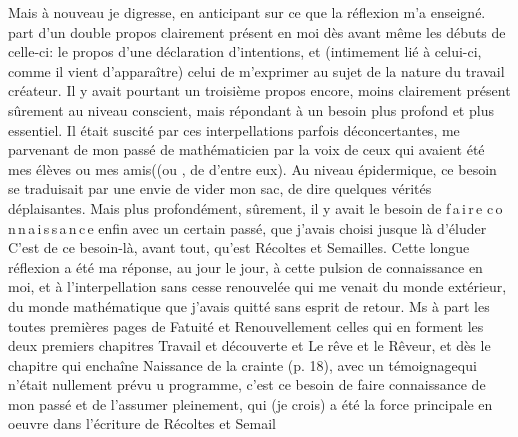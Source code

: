  Mais à nouveau je digresse, en anticipant sur ce que la réflexion m'a enseigné.  part d'un double propos\handwritten{,} clairement présent en moi dès avant même les débuts de celle-ci: le propos d'une déclaration d'intentions, et (intimement lié à celui-ci, comme il vient d'apparaître) celui de m'exprimer au sujet de la nature du travail créateur. Il y avait pourtant un troisième propos encore, moins clairement présent sûrement au niveau conscient, mais répondant à un besoin plus profond et plus essentiel. Il était suscité par ces interpellations parfois déconcertantes, me parvenant de mon passé de mathématicien par la voix de ceux qui avaient été mes élèves ou mes amis((ou , de  d'entre eux). Au niveau épidermique, ce besoin se traduisait par une envie de vider mon sac, de dire quelques vérités déplaisantes. Mais plus profondément, sûrement, il y avait le besoin de  \mbox{f\,a\,i\,r\,e} \mbox{c\,o\,n\,n\,a\,i\,s\,s\,a\,n\,c\,e} enfin avec un certain passé, que j'avais choisi jusque là d'éluder
C'est de ce besoin-là, avant tout, qu'est  Récoltes et Semailles. Cette longue réflexion a été ma réponse, au jour le jour, à cette pulsion de connaissance en moi, et à l'interpellation sans cesse renouvelée qui me venait du monde extérieur, du monde mathématique que j'avais quitté sans esprit de retour. Ms à part les toutes premières pages de Fatuité et Renouvellement \deleted{\unsure{,}}\handwritten{(}celles qui en forment les deux premiers chapitres Travail et découverte et Le rêve et le Rêveur\deleted{\unsure{,}}\handwritten{)}, et dès le chapitre qui enchaîne Naissance de la crainte (p. 18), avec un témoignagequi n'était nullement prévu u programme, c'est ce besoin de faire connaissance de mon passé et de l'assumer pleinement, qui (je crois) a été la force principale en oeuvre dans l'écriture de Récoltes et Semail 

